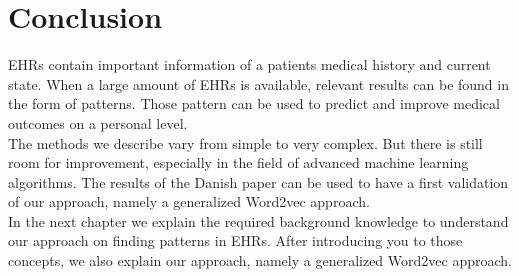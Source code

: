 \section{Conclusion}

EHRs contain important information of a patients medical history and current state. When a large amount of EHRs is available, relevant results can be found in the form of patterns. Those pattern can be used to predict and improve medical outcomes on a personal level. \\
The methods we describe vary from simple to very complex. But there is still room for improvement, especially in the field of advanced machine learning algorithms. The results of the Danish paper can be used to have a first validation of our approach, namely a generalized Word2vec approach. \\

In the next chapter we explain the required background knowledge to understand our approach on finding patterns in EHRs. After introducing you to those concepts, we also explain our approach, namely a generalized Word2vec approach.


